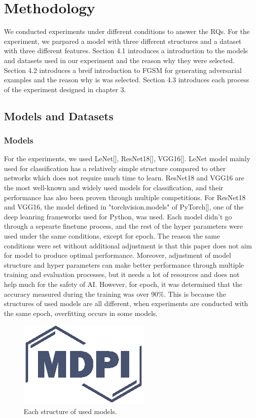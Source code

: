\documentclass[journal,article,submit,moreauthors,pdftex]{Definitions/mdpi}
\begin{document}
\section{Methodology}

We conducted experiments under different conditions to answer the RQs. For the experiment, we parpared a model with three different structures and a dataset with three different features.
Section 4.1 introduces a introduction to the models and datasets used in our experiment and the reason why they were selected.
Section 4.2 introduces a breif introduction to FGSM for generating adversarial examples and the reason why is was selected.
Section 4.3 introduces each process of the experiment designed in chapter 3.

\subsection{Models and Datasets}
\subsubsection{Models}

For the experiments, we used LeNet[], ResNet18[], VGG16[].
LeNet model mainly used for classification has a relatively simple structure compared to other networks which does not require much time to learn.
ResNet18 and VGG16 are the most well-known and widely used models for classification, and their performance has also been proven through multiple competitions.
For ResNet18 and VGG16, the model defined in "torchvision.models" of PyTorch[], one of the deep leanring frameworks used for Python, was used.
Each model didn't go through a sepearte finetune process, and the rest of the hyper parameters were used under the same conditions, except for epoch.
The reason the same conditions were set without additional adjustment is that this paper does not aim for model to produce optimal performance.
Moreover, adjustment of model structure and hyper parameters can make better performance through multiple training and evaluation processes, but it needs a lot of resources and does not help much for the safety of AI.
However, for epoch, it was determined that the accuracy measured during the training was over 90\%. This is because the structures of used models are all different, when experiments are conducted with the same epoch, overfitting occurs in some models.

\begin{figure}[H]
\includegraphics[width=5 cm]{Definitions/logo-mdpi}
\caption{Each structure of used models.\label{fig2}}
\end{figure}   
\end{document}
